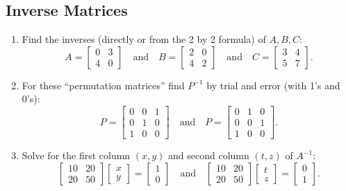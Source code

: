 \documentclass[14pt, a4paper]{article}
\begin{document}
\subsection{Inverse Matrices}

\begin{enumerate}

    \item Find the inverses (directly or from the 2 by 2 formula) of $A, B, C$:
          \[
              A = \begin{bmatrix} 0 & 3 \\ 4 & 0 \end{bmatrix}
              \quad\text{and}\quad
              B = \begin{bmatrix} 2 & 0 \\ 4 & 2 \end{bmatrix}
              \quad\text{and}\quad
              C = \begin{bmatrix} 3 & 4 \\ 5 & 7 \end{bmatrix}.
          \]

    \item For these ``permutation matrices'' find $P^{-1}$ by trial and error (with 1's and 0's):
          \[
              P = \begin{bmatrix} 0 & 0 & 1 \\ 0 & 1 & 0 \\ 1 & 0 & 0 \end{bmatrix}
              \quad\text{and}\quad
              P = \begin{bmatrix} 0 & 1 & 0 \\ 0 & 0 & 1 \\ 1 & 0 & 0 \end{bmatrix}.
          \]

    \item Solve for the first column $(x,y)$ and second column $(t,z)$ of $A^{-1}$:
          \[
              \begin{bmatrix} 10 & 20 \\ 20 & 50 \end{bmatrix}
              \begin{bmatrix} x \\ y \end{bmatrix}
              = \begin{bmatrix} 1 \\ 0 \end{bmatrix}
              \quad\text{and}\quad
              \begin{bmatrix} 10 & 20 \\ 20 & 50 \end{bmatrix}
              \begin{bmatrix} t \\ z \end{bmatrix}
              = \begin{bmatrix} 0 \\ 1 \end{bmatrix}.
          \]


\end{enumerate}
\end{document}
